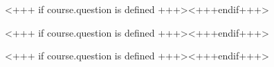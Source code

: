 \documentclass[english,xcolor=pdftex,dvipsnames,aspectratio=<+++ if course.aspectratio is defined +++><++course.aspectratio++><+++else+++>43<+++endif+++>]{beamer}
\begin{document}

<+++ if course.question is defined +++><+++endif+++> 


<+++ if course.question is defined +++><+++endif+++>


<+++ if course.question is defined +++><+++endif+++>

%  
\end{document}
